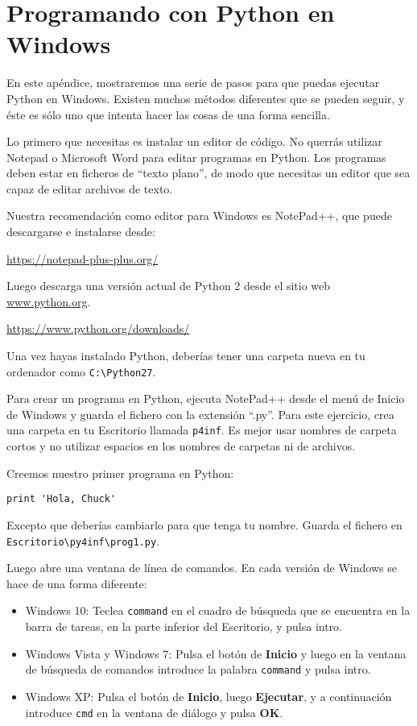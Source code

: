 
\chapter{Programando con Python en Windows}

En este apéndice, mostraremos una serie de pasos
para que puedas ejecutar Python en Windows. Existen muchos métodos
diferentes que se pueden seguir, y éste es sólo uno
que intenta hacer las cosas de una forma sencilla.

Lo primero que necesitas es instalar un editor de código. No
querrás utilizar Notepad o Microsoft Word para editar
programas en Python. Los programas deben estar en ficheros de ``texto plano'',
de modo que necesitas un editor que sea capaz de
editar archivos de texto.

Nuestra recomendación como editor para Windows es NotePad++, que
puede descargarse e instalarse desde:

\url{https://notepad-plus-plus.org/}

Luego descarga una versión actual de Python 2 desde el
sitio web \url{www.python.org}.

\url{https://www.python.org/downloads/}

Una vez hayas instalado Python, deberías tener una
carpeta nueva en tu ordenador como {\tt C:{\textbackslash}Python27}.

Para crear un programa en Python, ejecuta NotePad++ desde el menú de Inicio de Windows
y guarda el fichero con la extensión ``.py''. Para este
ejercicio, crea una carpeta en tu Escritorio llamada
{\tt p4inf}. Es mejor usar nombres de carpeta cortos
y no utilizar espacios en los nombres de carpetas ni de archivos.

Creemos nuestro primer programa en Python:

\beforeverb
\begin{verbatim}
print 'Hola, Chuck'
\end{verbatim}
\afterverb
%
Excepto que deberías cambiarlo para que tenga tu nombre. Guarda el fichero
en {\tt Escritorio{\textbackslash}py4inf{\textbackslash}prog1.py}.

Luego abre una ventana de línea de comandos. En cada versión de Windows
se hace de una forma diferente:

\begin{itemize}
\item Windows 10: Teclea {\tt command} en el cuadro de búsqueda
que se encuentra en la barra de tareas, en la parte inferior del Escritorio,
y pulsa intro.
	
\item Windows Vista y Windows 7: Pulsa el botón de {\bf Inicio}
y luego en la ventana de búsqueda de comandos introduce la palabra
{\tt command} y pulsa intro.

\item Windows XP: Pulsa el botón de {\bf Inicio}, luego {\bf Ejecutar}, y
a continuación introduce {\tt cmd} en la ventana de diálogo y pulsa {\bf OK}.
\end{itemize}

